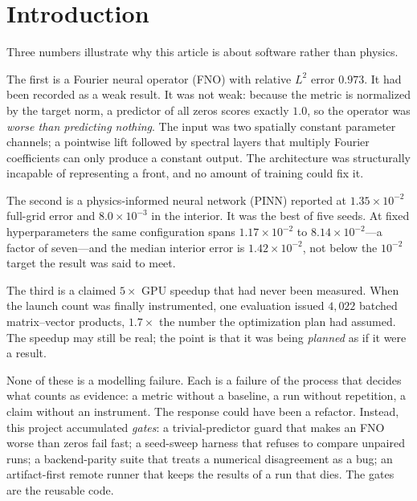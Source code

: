 \section{Introduction}
\label{sec:intro}

Three numbers illustrate why this article is about software rather than
physics.

The first is a Fourier neural operator (FNO) with relative $L^2$ error
$0.973$. It had been recorded as a weak result. It was not weak: because the
metric is normalized by the target norm, a predictor of all zeros scores exactly
$1.0$, so the operator was \emph{worse than predicting nothing}. The input was
two spatially constant parameter channels; a pointwise lift followed by spectral
layers that multiply Fourier coefficients can only produce a constant output.
The architecture was structurally incapable of representing a front, and no
amount of training could fix it.

The second is a physics-informed neural network (PINN) reported at
$1.35\times10^{-2}$ full-grid error and $8.0\times10^{-3}$ in the interior. It
was the best of five seeds. At fixed hyperparameters the same configuration
spans $1.17\times10^{-2}$ to $8.14\times10^{-2}$---a factor of seven---and the
median interior error is $1.42\times10^{-2}$, not below the $10^{-2}$ target the
result was said to meet.

The third is a claimed $5\times$ GPU speedup that had never been measured. When
the launch count was finally instrumented, one evaluation issued $4{,}022$
batched matrix--vector products, $1.7\times$ the number the optimization plan
had assumed. The speedup may still be real; the point is that it was being
\emph{planned} as if it were a result.

None of these is a modelling failure. Each is a failure of the process that
decides what counts as evidence: a metric without a baseline, a run without
repetition, a claim without an instrument. The response could have been a
refactor. Instead, this project accumulated \emph{gates}: a trivial-predictor
guard that makes an FNO worse than zeros fail fast; a seed-sweep harness that
refuses to compare unpaired runs; a backend-parity suite that treats a numerical
disagreement as a bug; an artifact-first remote runner that keeps the results of
a run that dies. The gates are the reusable code.

